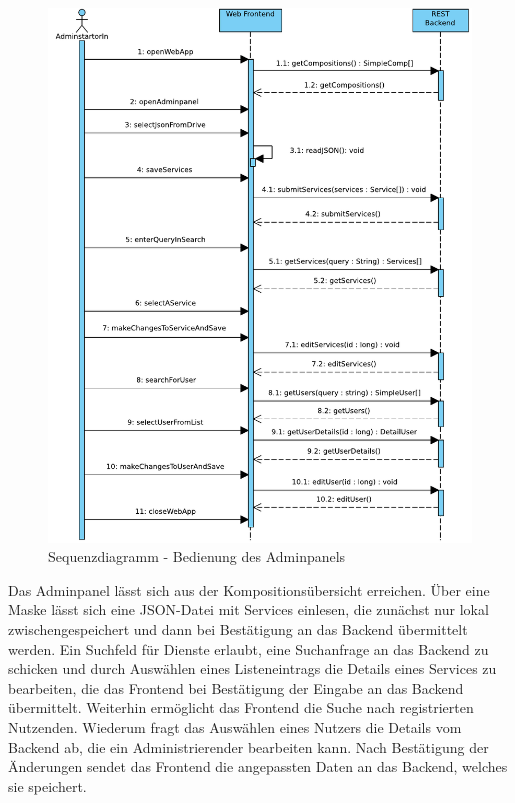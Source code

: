 \begin{figure}[!h]
	\centering
	\includegraphics[width=.5\textwidth]{img/Diagramme/Sequenz/Frontend_admin}			
	\caption{Sequenzdiagramm - Bedienung des Adminpanels}
	\label{fig:sequenz-adminPanel}
\end{figure}
\noindent
Das Adminpanel lässt sich aus der Kompositionsübersicht erreichen. Über eine Maske lässt sich eine JSON-Datei mit Services einlesen, die zunächst nur lokal zwischengespeichert und dann bei Bestätigung an das Backend übermittelt werden. Ein Suchfeld für Dienste erlaubt, eine Suchanfrage an das Backend zu schicken und durch Auswählen eines Listeneintrags die Details eines Services zu bearbeiten, die das Frontend bei Bestätigung der Eingabe an das Backend übermittelt. Weiterhin ermöglicht das Frontend die Suche nach registrierten Nutzenden. Wiederum fragt das Auswählen eines Nutzers die Details vom Backend ab, die ein Administrierender bearbeiten kann. Nach Bestätigung der Änderungen sendet das Frontend die angepassten Daten an das Backend, welches sie speichert.
